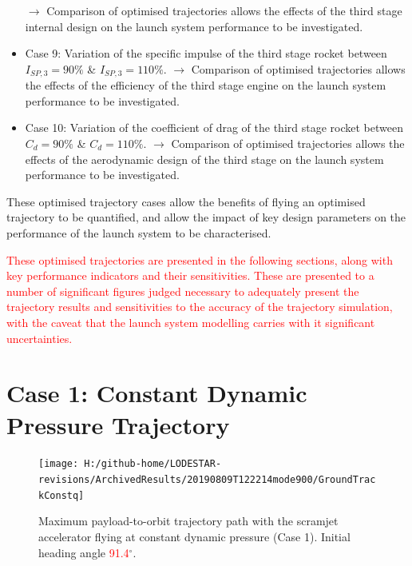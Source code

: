 \begin{itemize}
	\newline$\rightarrow$ Comparison of optimised trajectories allows the effects of the third stage internal design on the launch system performance to be investigated. 
	\item Case 9: Variation of the specific impulse of the third stage rocket between $I_{SP,3} = 90\%$ \& $I_{SP,3} = 110\%$. 
	\newline$\rightarrow$ Comparison of optimised trajectories allows the effects of the efficiency of the third stage engine on the launch system performance to be investigated. 
	\item Case 10: Variation of the coefficient of drag of the third stage rocket between $C_d = 90\%$ \& $C_d = 110\%$.
	\newline$\rightarrow$ Comparison of optimised trajectories allows the effects of the aerodynamic design of the third stage on the launch system performance to be investigated.
\end{itemize}
These optimised trajectory cases allow the benefits of flying an optimised trajectory to be quantified, and allow the impact of key design parameters on the performance of the launch system to be characterised. 

 \textcolor{red}{These optimised trajectories are presented in the following sections, along with key performance indicators and their sensitivities. These are presented to a number of significant figures judged necessary to adequately present the trajectory results and sensitivities to the accuracy of the trajectory simulation, with the caveat that the launch system modelling carries with it significant uncertainties.}
  

\section{Case 1: Constant Dynamic Pressure Trajectory}

\begin{figure}[ht]%
	\centering
	\texttt{[image: H:/github-home/LODESTAR-revisions/ArchivedResults/20190809T122214mode900/GroundTrackConstq]}
	\caption{Maximum payload-to-orbit trajectory path with the scramjet accelerator flying at constant dynamic pressure (Case 1). Initial heading angle \textcolor{red}{91.4}$^\circ$.}
	\label{fig:GroundTrackConstq}
\end{figure}

